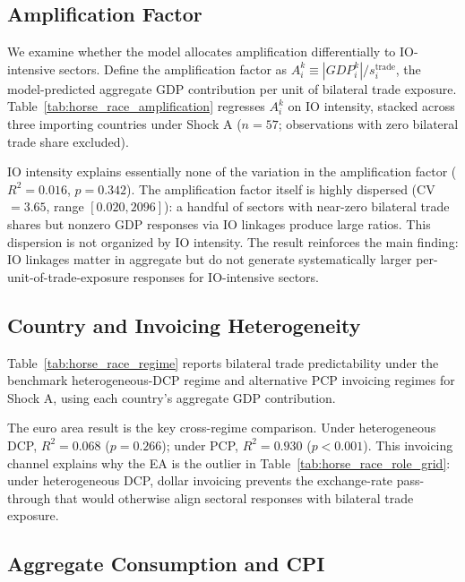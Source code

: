 \subsection{Amplification Factor}

We examine whether the model allocates amplification differentially to IO-intensive sectors. Define the amplification factor as $A_i^k \equiv |GDP_i^k| / s_i^{\text{trade}}$, the model-predicted aggregate GDP contribution per unit of bilateral trade exposure. Table~\ref{tab:horse_race_amplification} regresses $A_i^k$ on IO intensity, stacked across three importing countries under Shock A ($n=57$; observations with zero bilateral trade share excluded).



IO intensity explains essentially none of the variation in the amplification factor ($R^2 = 0.016$, $p = 0.342$). The amplification factor itself is highly dispersed (CV $= 3.65$, range $[0.020, 2096]$): a handful of sectors with near-zero bilateral trade shares but nonzero GDP responses via IO linkages produce large ratios. This dispersion is not organized by IO intensity. The result reinforces the main finding: IO linkages matter in aggregate but do not generate systematically larger per-unit-of-trade-exposure responses for IO-intensive sectors.

\subsection{Country and Invoicing Heterogeneity}\label{subsec:horse_race_regime}

Table~\ref{tab:horse_race_regime} reports bilateral trade predictability under the benchmark heterogeneous-DCP regime and alternative PCP invoicing regimes for Shock A, using each country's aggregate GDP contribution.



The euro area result is the key cross-regime comparison. Under heterogeneous DCP, $R^2 = 0.068$ ($p = 0.266$); under PCP, $R^2 = 0.930$ ($p < 0.001$). This invoicing channel explains why the EA is the outlier in Table~\ref{tab:horse_race_role_grid}: under heterogeneous DCP, dollar invoicing prevents the exchange-rate pass-through that would otherwise align sectoral responses with bilateral trade exposure.

\subsection{Aggregate Consumption and CPI}

